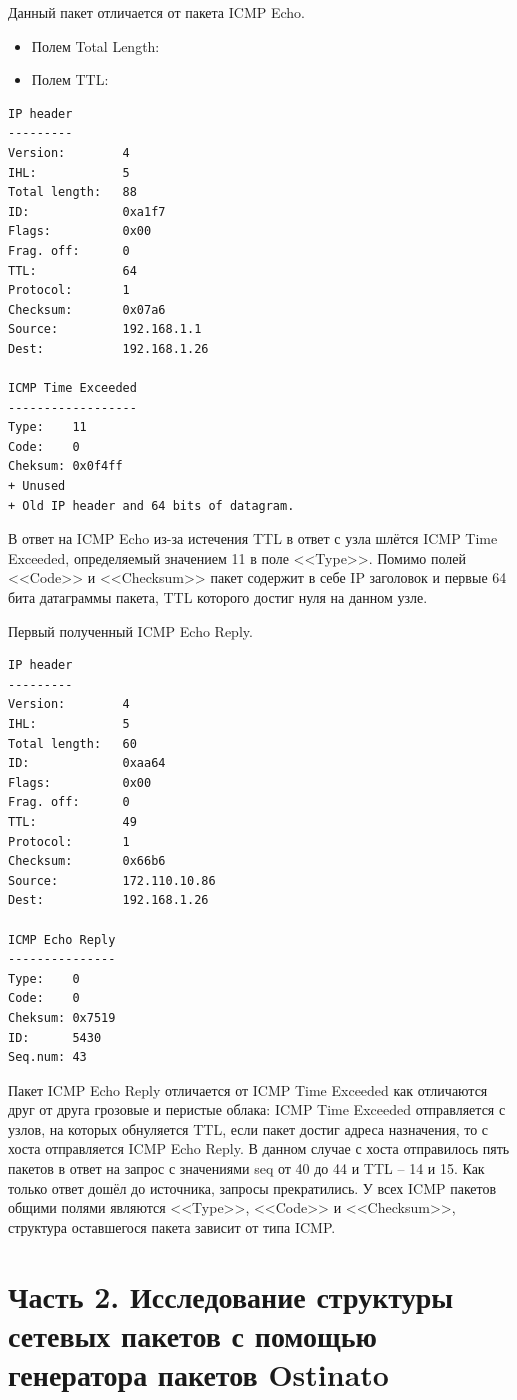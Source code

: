 \documentclass[12pt, a4paper] {ncc}
\begin{document}
Данный пакет отличается от пакета ICMP Echo.
\begin{itemize}
	\item Полем Total Length:
	\item Полем TTL:
\end{itemize}

\begin{verbatim}
IP header
---------
Version:        4
IHL:            5
Total length:   88
ID:             0xa1f7
Flags:          0x00
Frag. off:      0
TTL:            64
Protocol:       1
Checksum:       0x07a6
Source:         192.168.1.1
Dest:           192.168.1.26

ICMP Time Exceeded
------------------
Type:    11
Code:    0
Cheksum: 0x0f4ff
+ Unused
+ Old IP header and 64 bits of datagram.
\end{verbatim}

В ответ на ICMP Echo из-за истечения TTL в ответ с узла шлётся ICMP Time Exceeded,
определяемый значением 11 в поле <<Type>>. Помимо полей <<Code>> и <<Checksum>>
пакет содержит в себе IP заголовок и первые 64 бита датаграммы пакета, TTL которого
достиг нуля на данном узле.

Первый полученный ICMP Echo Reply.
\begin{verbatim}
IP header
---------
Version:        4
IHL:            5
Total length:   60
ID:             0xaa64
Flags:          0x00
Frag. off:      0
TTL:            49
Protocol:       1
Checksum:       0x66b6
Source:         172.110.10.86
Dest:           192.168.1.26

ICMP Echo Reply
---------------
Type:    0
Code:    0
Cheksum: 0x7519
ID:      5430
Seq.num: 43
\end{verbatim}

Пакет ICMP Echo Reply отличается от ICMP Time Exceeded как отличаются друг от друга грозовые и
перистые облака: ICMP Time Exceeded отправляется с узлов, на которых обнуляется TTL, если
пакет достиг адреса назначения, то с хоста отправляется ICMP Echo Reply. В данном случае
с хоста отправилось пять пакетов в ответ на запрос с значениями seq от 40 до 44 и
TTL -- 14 и 15. Как только ответ дошёл до источника, запросы прекратились. У всех ICMP
пакетов общими полями являются <<Type>>, <<Code>> и <<Checksum>>, структура оставшегося
пакета зависит от типа ICMP.

\newpage
\section*{Часть 2. Исследование структуры сетевых пакетов с помощью генератора пакетов Ostinato}
\end{document}

